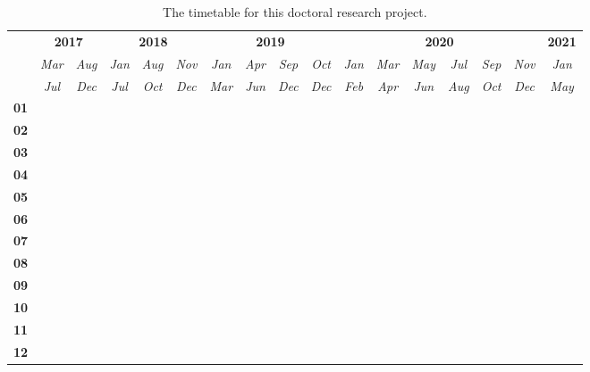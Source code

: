 \begin{table}[htb]
  \renewcommand{\arraystretch}{1.4}
  \caption{The timetable for this doctoral research project.}
  \label{tab:timetable}
  \scriptsize
  \centering
  \begin{tabular}{c|cc|ccc|cccc|cccccc|c}
    \toprule
    & \multicolumn{2}{c|}{{\bf 2017}}
    & \multicolumn{3}{c|}{{\bf 2018}}
    & \multicolumn{4}{c|}{{\bf 2019}}
    & \multicolumn{6}{c|}{{\bf 2020}}
    & {\bf 2021} \\

    & {\it Mar} & {\it Aug} & {\it Jan} & {\it Aug} & {\it Nov} & {\it Jan} &
    {\it Apr} & {\it Sep} & {\it Oct} & {\it Jan} & {\it Mar} & {\it May} &
    {\it Jul} & {\it Sep} & {\it Nov} & {\it Jan} \\

    & {\it Jul} & {\it Dec} & {\it Jul} & {\it Oct} & {\it Dec} & {\it Mar} &
    {\it Jun} & {\it Dec} & {\it Dec} & {\it Feb} & {\it Apr} & {\it Jun} &
    {\it Aug} & {\it Oct} & {\it Dec} & {\it May} \\
    \hline %
    \arrayrulecolor{lightgray}

    {\bf 01} & \m & \m &    &    &    &    &    &    &    &    &    &    &    &    &    &    \\ \hline
    {\bf 02} &    & \m & \m & \m &    &    &    &    &    &    &    &    &    &    &    &    \\ \hline
    {\bf 03} &    &    & \m & \m & \m & \m &    &    &    &    &    &    &    &    &    &    \\ \hline
    {\bf 04} &    &    &    &    & \m & \m & \m &    &    &    &    &    &    &    &    &    \\ \hline
    {\bf 05} &    &    &    &    & \m & \m & \m & \m &    &    &    &    &    &    &    &    \\ \hline
    {\bf 06} &    &    &    &    &    &    &    & \m & \m &    &    &    &    &    &    &    \\ \hline
    {\bf 07} &    &    &    &    &    &    &    &    & \x & \x &    &    &    &    &    &    \\ \hline
    {\bf 08} &    &    &    &    &    &    &    &    & \x & \x & \x &    &    &    &    &    \\ \hline
    {\bf 09} &    &    &    &    &    &    &    &    &    & \x & \x & \x & \x & \x &    &    \\ \hline
    {\bf 10} &    &    &    &    &    &    &    &    &    &    &    & \x & \x & \x & \x &    \\ \hline
    {\bf 11} &    &    &    &    &    &    &    &    &    &    &    &    &    & \x & \x &    \\ \hline
    {\bf 12} &    &    &    &    &    &    &    &    &    &    &    &    &    & \x & \x & \x \\


\end{tabular}
\end{table}
